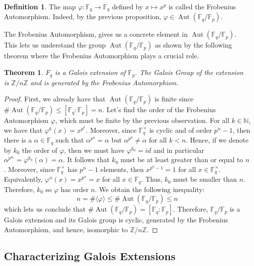 \documentclass{article}
\theoremstyle{plain}
\newtheorem{theorem}{Theorem}[subsection]
\theoremstyle{definition}
\newtheorem*{definition}{Definition}
\newcommand{\N}{\mathbb{N}}
\newcommand{\F}{\mathbb{F}}
\newcommand{\Zn}[1]{\mathbb{Z}/ #1 \mathbb{Z}}
\DeclareMathOperator{\Aut}{Aut}
\begin{document}
\begin{definition}
    The map $\varphi : \F_q \to \F_q$ defined by $x \mapsto x^p$ is called the Frobenius Automorphism. Indeed, by the previous proposition, $\varphi \in \Aut(\F_q / \F_p)$.
\end{definition}

The Frobenius Automorphism, gives us a concrete element in $\Aut(\F_q / \F_p)$. This lets us understand the group $\Aut(\F_q / \F_p)$ as shown by the following theorem where the Frobenius Automorphism plays a crucial role. 

\begin{theorem}
    $F_q$ is a Galois extension of $\F_p$. The Galois Group of the extension is $\Zn{n}$ and is generated by the Frobenius Automorphism.
\end{theorem}

\begin{proof}
    First, we already have that $\Aut(\F_q / \F_p)$ is finite since $\#\Aut(\F_q / \F_p) \leq [\F_q : \F_p] = n$. Let's find the order of the Frobenius Automorphism $\varphi$, which must be finite by the previous observation. For all $k \in \N$, we have that $\varphi^k(x) = x^{p^k}$. Moreover, since $\F_q^{\times}$ is cyclic and of order $p^n - 1$, then there is a $\alpha \in \F_q$ such that $\alpha^{p^n} = \alpha$ but $\alpha^{p^k} \neq \alpha$ for all $k < n$. Hence, if we denote by $k_0$ the order of $\varphi$, then we must have $\varphi^{k_0} = id$ and in particular $\alpha^{p^{k_0}} = \varphi^{k_0}(\alpha) = \alpha$. It follows that $k_0$ must be at least greater than or equal to $n$. Moreover, since $\F_q^{\times}$ has $p^{n} - 1$ elements, then $x^{p^n - 1} = 1$ for all $x \in \F_q^{\times}$. Equivalently, $\varphi^n(x) = x^{p^n} = x$ for all $x \in \F_q$. Thus, $k_0$ must be smaller than $n$. Therefore, $k_0$ so $\varphi$ has order $n$. We obtain the following inequality:
    $$n = \# \langle \varphi \rangle \leq \# \Aut(\F_q / \F_p) \leq n$$
    which lets us conclude that $\# \Aut(\F_q / \F_p) = [\F_q : \F_p]$. Therefore, $\F_q / \F_p$ is a Galois extension and its Galois group is cyclic, generated by the Frobenius Automorphism, and hence, isomorphic to $\Zn{n}$.
\end{proof}

\subsection{Characterizing Galois Extensions} \label{characterizations of galois extensions}
\end{document}
